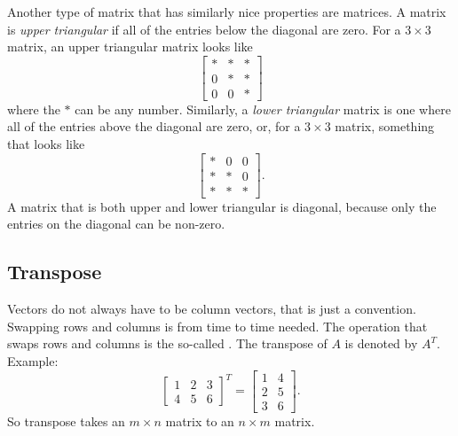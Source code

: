 \documentclass{ximera}
\begin{document}
Another type of matrix that has similarly nice properties are \emph{} matrices. A matrix is \emph{upper triangular} if all of the entries below the diagonal are zero. For a $3\times 3$ matrix, an upper triangular matrix  looks like
\[ 
    \begin{bmatrix} 
        * & * & * \\ 
        0 & * & * \\ 
        0 & 0 & * 
    \end{bmatrix} 
\] 
where the $*$ can be any number. Similarly, a \emph{lower triangular} matrix is one where all of the entries above the diagonal are zero, or, for a $3 \times 3$ matrix, something that looks like  
\[ 
    \begin{bmatrix} 
        * & 0 & 0 \\ 
        * & * & 0 \\ 
        * & * & * 
    \end{bmatrix}. 
\] 
A matrix that is both upper and lower triangular is diagonal, because only the entries on the diagonal can be non-zero. 

\subsection{Transpose}

Vectors do not always have to be column vectors, that is just a convention. Swapping rows and columns is from time to time needed. The operation that swaps rows and columns is the so-called \emph{}. The transpose of $A$ is denoted by $A^T$.  Example:
\begin{equation*}
    \begin{bmatrix}
        1 & 2 & 3 \\
        4 & 5 & 6
    \end{bmatrix}^T =
    \begin{bmatrix}
        1 & 4 \\
        2 & 5 \\
        3 & 6 
    \end{bmatrix} .
\end{equation*}
So transpose takes an $m \times n$ matrix to an $n \times m$ matrix.
\end{document}
